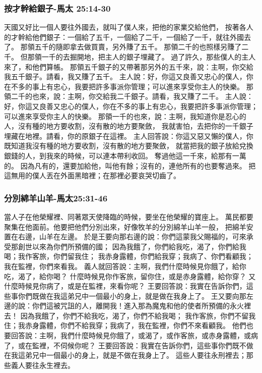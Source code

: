 \subsubsection{按才幹給銀子-馬太 25:14-30}
天國又好比一個人要往外國去，就叫了僕人來，把他的家業交給他們，
按著各人的才幹給他們銀子：一個給了五千，一個給了二千，一個給了一千，就往外國去了。
那領五千的隨即拿去做買賣，另外賺了五千。
那領二千的也照樣另賺了二千。
但那領一千的去掘開地，把主人的銀子埋藏了。
過了許久，那些僕人的主人來了，和他們算帳。
那領五千銀子的又帶著那另外的五千來，說：主啊，你交給我五千銀子。請看，我又賺了五千。
主人說：好，你這又良善又忠心的僕人，你在不多的事上有忠心，我要把許多事派你管理；可以進來享受你主人的快樂。
那領二千的也來，說：主啊，你交給我二千銀子。請看，我又賺了二千。
主人說：好，你這又良善又忠心的僕人，你在不多的事上有忠心，我要把許多事派你管理；可以進來享受你主人的快樂。
那領一千的也來，說：主啊，我知道你是忍心的人，沒有種的地方要收割，沒有散的地方要聚斂，
我就害怕，去把你的一千銀子埋藏在地裡。請看，你的原銀子在這裡。
主人回答說：你這又惡又懶的僕人，你既知道我沒有種的地方要收割，沒有散的地方要聚斂，
就當把我的銀子放給兌換銀錢的人，到我來的時候，可以連本帶利收回。
奪過他這一千來，給那有一萬的。
因為凡有的，還要加給他，叫他有餘；沒有的，連他所有的也要奪過來。
把這無用的僕人丟在外面黑暗裡；在那裡必要哀哭切齒了。

\subsubsection{分別綿羊山羊-馬太25:31-46}
當人子在他榮耀裡、同著眾天使降臨的時候，要坐在他榮耀的寶座上。
萬民都要聚集在他面前。他要把他們分別出來，好像牧羊的分別綿羊山羊一般，
把綿羊安置在右邊，山羊在左邊。
於是王要向那右邊的說：你們這蒙我父賜福的，可來承受那創世以來為你們所預備的國；
因為我餓了，你們給我吃，渴了，你們給我喝；我作客旅，你們留我住；
我赤身露體，你們給我穿；我病了、你們看顧我；我在監裡，你們來看我。
義人就回答說：主啊，我們什麼時候見你餓了，給你吃，渴了，給你喝？
什麼時候見你作客旅，留你住，或是赤身露體，給你穿？
又什麼時候見你病了，或是在監裡，來看你呢？
王要回答說：我實在告訴你們，這些事你們既做在我這弟兄中一個最小的身上，就是做在我身上了。
王又要向那左邊的說：你們這被咒詛的人，離開我！進入那為魔鬼和他的使者所預備的永火裡去！
因為我餓了，你們不給我吃，渴了，你們不給我喝；
我作客旅，你們不留我住；我赤身露體，你們不給我穿；我病了，我在監裡，你們不來看顧我。
他們也要回答說：主啊，我們什麼時候見你餓了，或渴了，或作客旅，或赤身露體，或病了，或在監裡，不伺候你呢？
王要回答說：我實在告訴你們，這些事你們既不做在我這弟兄中一個最小的身上，就是不做在我身上了。
這些人要往永刑裡去；那些義人要往永生裡去。



